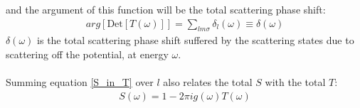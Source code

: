 \documentclass[twoside,11pt]{report}
\numberwithin{equation}{section}
\begin{document}
and the argument of this function will be the total scattering phase shift:
\begin{equation}\begin{aligned}
	\label{phase_in_T}
	arg\left[\text{Det}\left[ T(\omega) \right]\right] = \sum_{lm\sigma} \delta_l(\omega) \equiv \delta(\omega)
\end{aligned}\end{equation}
\(\delta(\omega)\) is the total scattering phase shift suffered by the scattering states due to scattering off the potential, at energy \(\omega\).
\\\\Summing equation \ref{S_in_T} over \(l\) also relates the total \(S\) with the total \(T\):
\begin{equation}\begin{aligned}
	S(\omega) = 1 - 2\pi i g(\omega) T(\omega)
\end{aligned}\end{equation}
\end{document}

